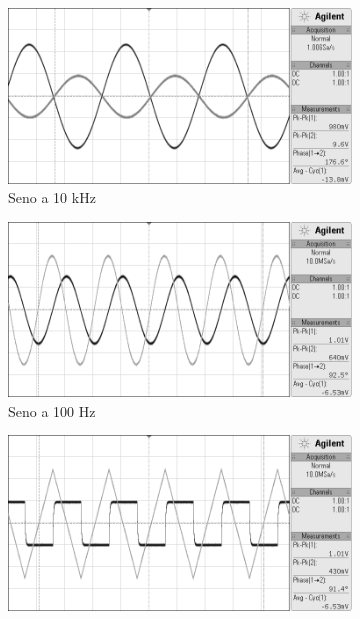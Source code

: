 \begin{figure}[b!]
    \centering
    \begin{subfigure}[t]{0.49\textwidth}
        \includegraphics[width=\textwidth]{s12.png}
        \caption{Seno a 10 kHz}
        \label{fig:b1}
    \end{subfigure}
    \begin{subfigure}[t]{0.49\textwidth}
        \includegraphics[width=\textwidth]{s13.png}
        \caption{Seno a 100 Hz}
        \label{fig:b2}
    \end{subfigure}
    \begin{subfigure}[t]{0.49\textwidth}
        \includegraphics[width=\textwidth]{s14.png}

\end{subfigure}
\end{figure}
